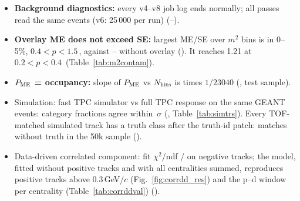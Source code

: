 \begin{itemize}
\item \textbf{Background diagnostics:} every v4--v8 job log ends normally; all passes read the same \meEvtAllVthree{} events
  (v6: 25\,000 per run) (--).
\item \textbf{Overlay ME does not exceed SE:} largest ME/SE over $m^2$ bins is \mtValleyAllVthree{} in 0--5\%,
  $0.4<p<1.5$\,\GeVc{}, against \mtValleyPlainMinVthree--\mtValleyPlainMaxVthree{} without overlay ().
  It reaches 1.21 at $0.2<p<0.4$\,\GeVc{} (Table~\ref{tab:m2contam}).
\item \textbf{$P_{\rm ME}$ = occupancy:} slope of $P_{\rm ME}$ vs $N_{\rm hits}$ is \meSlopeRatioTest{} times $1/23040$
  (, test sample).
\item Simulation: fast TPC simulator vs full TPC response on the same \simEvGenOneK{} GEANT events: category fractions agree within
  \simTrsMaxSig\,$\sigma$ (, Table~\ref{tab:simtrs}). Every TOF-matched simulated track has a truth class
  after the  truth-id patch: \simNoTruth{} matches without truth in the 50k sample ().
\item Data-driven correlated component: fit $\chi^2$/ndf \cddChiN/\cddNdf{} on negative tracks; the model, fitted without positive tracks
  and with all centralities summed, reproduces positive tracks above 0.3\,GeV/$c$ (Fig.~\ref{fig:corrdd_res}) and the p--d window per
  centrality (Table~\ref{tab:corrddval}) ().
\end{itemize}

